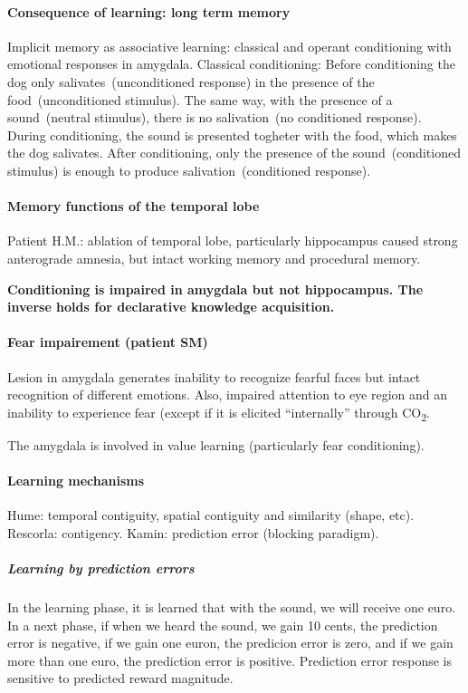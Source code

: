 \documentclass[12pt,article,oneside,a4paper]{memoir}
\begin{document}
\paragraph{Consequence of learning: long term memory}
Implicit memory as associative learning: classical and operant conditioning
with emotional responses in amygdala.
Classical conditioning: Before conditioning the dog only
salivates~(unconditioned response) in the presence of the food~(unconditioned stimulus).
The same way, with the presence of a sound~(neutral stimulus), there is no
salivation~(no conditioned response). During conditioning, the sound is
presented togheter with the food, which makes the dog salivates. After
conditioning, only the presence of the sound~(conditioned stimulus) is enough
to produce salivation~(conditioned response).

\paragraph{Memory functions of the temporal lobe}
Patient H.M.: ablation of temporal lobe, particularly hippocampus caused strong
anterograde amnesia, but intact working memory and procedural memory.

\textbf{Conditioning is impaired in amygdala but not hippocampus. The inverse
holds for declarative knowledge acquisition.}

\paragraph{Fear impairement (patient SM)}
Lesion in amygdala generates inability to recognize fearful faces but intact
recognition of different emotions. Also, impaired attention to eye region and
an inability to experience fear (except if it is elicited ``internally''
through CO\textsubscript{2}.

The amygdala is involved in value learning (particularly fear conditioning).

\paragraph{Learning mechanisms}
Hume: temporal contiguity, spatial contiguity and similarity (shape, etc).
Rescorla: contigency.
Kamin: prediction error (blocking paradigm).

\subparagraph{Learning by prediction errors}
In the learning phase, it is learned that with the sound, we will receive one
euro. In a next phase, if when we heard the sound, we gain 10 cents, the
prediction error is negative, if we gain one euron, the predicion error is
zero, and if we gain more than one euro, the prediction error is positive.
Prediction error response is sensitive to predicted reward magnitude.
\end{document}
